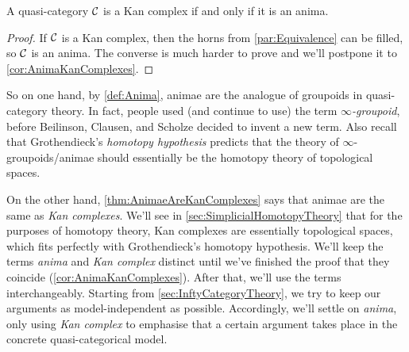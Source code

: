 \begin{thm}\label{thm:AnimaeAreKanComplexes}
	A quasi-category $\mathcal{C}$ is a Kan complex if and only if it is an anima.
\end{thm}
\begin{proof}
	If $\mathcal{C}$ is a Kan complex, then the horns from \cref{par:Equivalence} can be filled, so $\mathcal{C}$ is an anima. The converse is much harder to prove and we'll postpone it to \cref{cor:AnimaKanComplexes}.
\end{proof}
So on one hand, by \cref{def:Anima}, animae are the analogue of groupoids in quasi-category theory. In fact, people used (and continue to use) the term \emph{$\infty$-groupoid}, before Beilinson, Clausen, and Scholze decided to invent a new term. Also recall that Grothendieck's \emph{homotopy hypothesis} predicts that the theory of $\infty$-groupoids/animae should essentially be the homotopy theory of topological spaces.

On the other hand, \cref{thm:AnimaeAreKanComplexes} says that animae are the same as \emph{Kan complexes}. We'll see in \cref{sec:SimplicialHomotopyTheory} that for the purposes of homotopy theory, Kan complexes are essentially topological spaces, which fits perfectly with Grothendieck's homotopy hypothesis. We'll keep the terms \emph{anima} and \emph{Kan complex} distinct until we've finished the proof that they coincide (\cref{cor:AnimaKanComplexes}). After that, we'll use the terms interchangeably. Starting from \cref{sec:InftyCategoryTheory}, we try to keep our arguments as model-independent as possible. Accordingly, we'll settle on \emph{anima}, only using \emph{Kan complex} to emphasise that a certain argument takes place in the concrete quasi-categorical model.


